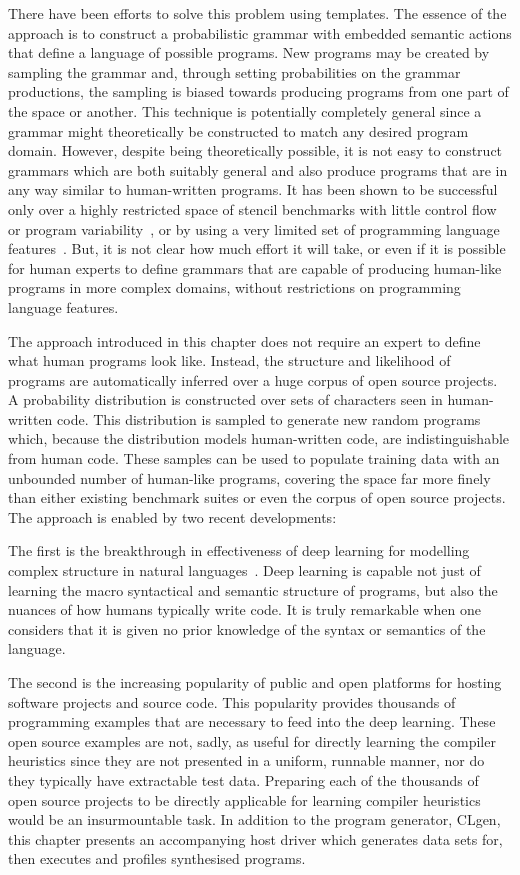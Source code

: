 There have been efforts to solve this problem using templates. The essence of the approach is to construct a probabilistic grammar with embedded semantic actions that define a language of possible programs. New programs may be created by sampling the grammar and, through setting probabilities on the grammar productions, the sampling is biased towards producing programs from one part of the space or another. This technique is potentially completely general since a grammar might theoretically be constructed to match any desired program domain. However, despite being theoretically possible, it is not easy to construct grammars which are both suitably general and also produce programs that are in any way similar to human-written programs. It has been shown to be successful only over a highly restricted space of stencil benchmarks with little control flow or program variability~\cite{Falch2015,Cummins2016a}, or by using a very limited set of programming language features~\cite{Kosta2019}. But, it is not clear how much effort it will take, or even if it is possible for human experts to define grammars that are capable of producing human-like programs in more complex domains, without restrictions on programming language features.

The approach introduced in this chapter does not require an expert to define what human programs look like. Instead, the structure and likelihood of programs are automatically inferred over a huge corpus of open source projects. A probability distribution is constructed over sets of characters seen in human-written code. This distribution is sampled to generate new random programs which, because the distribution models human-written code, are indistinguishable from human code. These samples can be used to populate training data with an unbounded number of human-like programs, covering the space far more finely than either existing benchmark suites or even the corpus of open source projects. The approach is enabled by two recent developments:

The first is the breakthrough in effectiveness of deep learning for modelling complex structure in natural languages~\cite{Graves2013,Sutskever2014}. Deep learning is capable not just of learning the macro syntactical and semantic structure of programs, but also the nuances of how humans typically write code. It is truly remarkable when one considers that it is given no prior knowledge of the syntax or semantics of the language.

The second is the increasing popularity of public and open platforms for hosting software projects and source code. This popularity provides thousands of programming examples that are necessary to feed into the deep learning. These open source examples are not, sadly, as useful for directly learning the compiler heuristics since they are not presented in a uniform, runnable manner, nor do they typically have extractable test data. Preparing each of the thousands of open source projects to be directly applicable for learning compiler heuristics would be an insurmountable task. In addition to the program generator, CLgen, this chapter presents an accompanying host driver which generates data sets for, then executes and profiles synthesised programs.

